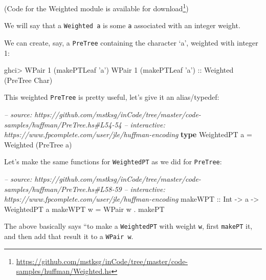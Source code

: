 \documentclass[]{article}
\newenvironment{Shaded}{\begin{snugshade}}{\end{snugshade}}
\newcommand{\CharTok}[1]{\textcolor[rgb]{0.31,0.60,0.02}{#1}}
\newcommand{\CommentTok}[1]{\textcolor[rgb]{0.56,0.35,0.01}{\textit{#1}}}
\newcommand{\DataTypeTok}[1]{\textcolor[rgb]{0.13,0.29,0.53}{#1}}
\newcommand{\DecValTok}[1]{\textcolor[rgb]{0.00,0.00,0.81}{#1}}
\newcommand{\FunctionTok}[1]{\textcolor[rgb]{0.00,0.00,0.00}{#1}}
\newcommand{\KeywordTok}[1]{\textcolor[rgb]{0.13,0.29,0.53}{\textbf{#1}}}
\newcommand{\NormalTok}[1]{#1}
\newcommand{\OtherTok}[1]{\textcolor[rgb]{0.56,0.35,0.01}{#1}}
\renewcommand{\href}[2]{#2\footnote{\url{#1}}}
\begin{document}
(Code for the Weighted module is
\href{https://github.com/mstksg/inCode/tree/master/code-samples/huffman/Weighted.hs}{available
for download})

We will say that a \texttt{Weighted\ a} is some \texttt{a} associated with an
integer weight.

We can create, say, a \texttt{PreTree} containing the character `a', weighted
with integer 1:

\begin{Shaded}
\begin{Highlighting}[]
\NormalTok{ghci}\FunctionTok{>} \DataTypeTok{WPair} \DecValTok{1}\NormalTok{ (makePTLeaf }\CharTok{'a'}\NormalTok{)}
\DataTypeTok{WPair} \DecValTok{1}\NormalTok{ (makePTLeaf }\CharTok{'a'}\NormalTok{)}\OtherTok{ ::} \DataTypeTok{Weighted}\NormalTok{ (}\DataTypeTok{PreTree} \DataTypeTok{Char}\NormalTok{)}
\end{Highlighting}
\end{Shaded}

This weighted \texttt{PreTree} is pretty useful, let's give it an alias/typedef:

\begin{Shaded}
\begin{Highlighting}[]
\CommentTok{-- source: https://github.com/mstksg/inCode/tree/master/code-samples/huffman/PreTree.hs#L54-54}
\CommentTok{-- interactive: https://www.fpcomplete.com/user/jle/huffman-encoding}
\KeywordTok{type} \DataTypeTok{WeightedPT}\NormalTok{ a }\FunctionTok{=} \DataTypeTok{Weighted}\NormalTok{ (}\DataTypeTok{PreTree}\NormalTok{ a)}
\end{Highlighting}
\end{Shaded}

Let's make the same functions for \texttt{WeightedPT} as we did for
\texttt{PreTree}:

\begin{Shaded}
\begin{Highlighting}[]
\CommentTok{-- source: https://github.com/mstksg/inCode/tree/master/code-samples/huffman/PreTree.hs#L58-59}
\CommentTok{-- interactive: https://www.fpcomplete.com/user/jle/huffman-encoding}
\OtherTok{makeWPT ::} \DataTypeTok{Int} \OtherTok{->}\NormalTok{ a }\OtherTok{->} \DataTypeTok{WeightedPT}\NormalTok{ a}
\NormalTok{makeWPT w }\FunctionTok{=} \DataTypeTok{WPair}\NormalTok{ w }\FunctionTok{.}\NormalTok{ makePT}
\end{Highlighting}
\end{Shaded}

The above basically says ``to make a \texttt{WeightedPT} with weight \texttt{w},
first \texttt{makePT} it, and then add that result it to a \texttt{WPair\ w}.
\end{document}

